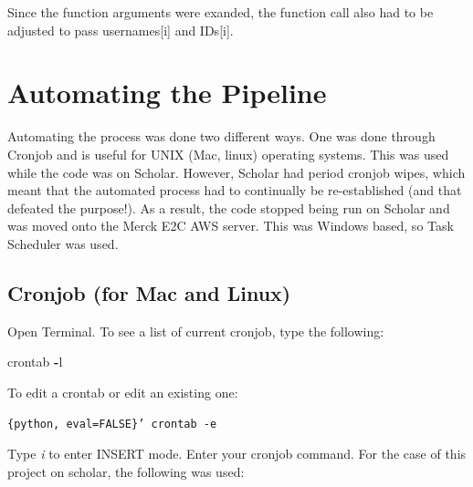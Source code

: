 \documentclass[]{book}
\newenvironment{Shaded}{\begin{snugshade}}{\end{snugshade}}
\newcommand{\KeywordTok}[1]{\textcolor[rgb]{0.13,0.29,0.53}{\textbf{#1}}}
\newcommand{\DecValTok}[1]{\textcolor[rgb]{0.00,0.00,0.81}{#1}}
\newcommand{\SpecialCharTok}[1]{\textcolor[rgb]{0.00,0.00,0.00}{#1}}
\newcommand{\StringTok}[1]{\textcolor[rgb]{0.31,0.60,0.02}{#1}}
\newcommand{\CommentTok}[1]{\textcolor[rgb]{0.56,0.35,0.01}{\textit{#1}}}
\newcommand{\ControlFlowTok}[1]{\textcolor[rgb]{0.13,0.29,0.53}{\textbf{#1}}}
\newcommand{\OperatorTok}[1]{\textcolor[rgb]{0.81,0.36,0.00}{\textbf{#1}}}
\newcommand{\BuiltInTok}[1]{#1}
\newcommand{\NormalTok}[1]{#1}
\begin{document}
Since the function arguments were exanded, the function call also had to
be adjusted to pass usernames{[}i{]} and IDs{[}i{]}.

\begin{Shaded}
\end{Shaded}

\section{Automating the Pipeline}\label{automating-the-pipeline}

Automating the process was done two different ways. One was done through
Cronjob and is useful for UNIX (Mac, linux) operating systems. This was
used while the code was on Scholar. However, Scholar had period cronjob
wipes, which meant that the automated process had to continually be
re-established (and that defeated the purpose!). As a result, the code
stopped being run on Scholar and was moved onto the Merck E2C AWS
server. This was Windows based, so Task Scheduler was used.

\subsection{Cronjob (for Mac and
Linux)}\label{cronjob-for-mac-and-linux}

Open Terminal. To see a list of current cronjob, type the following:

\begin{Shaded}
\begin{Highlighting}[]
\NormalTok{crontab }\OperatorTok{-}\NormalTok{l}
\end{Highlighting}
\end{Shaded}

To edit a crontab or edit an existing one:

\texttt{\{python,\ eval=FALSE\}’\ crontab\ -e}

Type \emph{i} to enter INSERT mode. Enter your cronjob command. For the
case of this project on scholar, the following was used:
\end{document}
